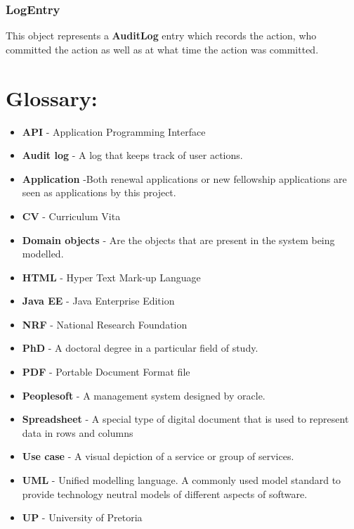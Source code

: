 \documentclass[12pt]{article}
\begin{document}
\subsubsection{LogEntry}
This object represents a \textbf{AuditLog} entry which records the action, who committed the action as well as at what time the action was committed.

\newpage
\section{Glossary:}
\vspace{0.2in}

\begin{itemize}

\item \textbf{API} - Application Programming Interface
\item \textbf{Audit log} - A log that keeps track of user actions.
\item \textbf{Application} -Both renewal applications or new fellowship applications are seen as applications by this project.
\item \textbf{CV} - Curriculum Vita
\item \textbf{Domain objects} - Are the objects that are present in the system being modelled.
\item \textbf{HTML} - Hyper Text Mark-up Language
\item \textbf{Java EE} - Java Enterprise Edition
\item \textbf{NRF} - National Research Foundation
\item \textbf{PhD} - A doctoral degree in a particular field of study.
\item \textbf{PDF} - Portable Document Format file
\item \textbf{Peoplesoft} - A management system designed by oracle. 
\item \textbf{Spreadsheet} - A special type of digital document that is used to represent data in rows and columns
\item \textbf{Use case} - A visual depiction of a service or group of services.
\item \textbf{UML} - Unified modelling language. A commonly used model standard to provide technology neutral models of different aspects of software.
\item \textbf{UP} - University of Pretoria
 


\end{itemize}	
\end{document}
